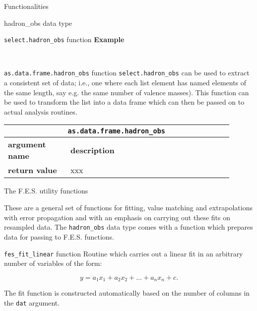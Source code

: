 \documentclass[10pt,a5paper]{article}
\begin{document}
\begin{section}{Functionalities}
\begin{subsection}{{\ttfamily hadron\_obs} data type}
\begin{subsubsection}{{\tt select.hadron\_obs} function}
\textbf{Example}

\

\end{subsubsection}

\begin{subsubsection}{ {\tt as.data.frame.hadron\_obs} function }
{\tt select.hadron\_obs} can be used to extract a consistent set of data; i.e., one where each list element has named elements of the same length, say e.g. the same number of valence masses).
This function can be used to transform the list into a data frame which can then be passed on to actual analysis routines.

{ \centering
\begin{tabular}{|p{0.25\linewidth}|p{0.65\linewidth}|}
\hline
\multicolumn{2}{|c|}{ {\tt as.data.frame.hadron\_obs} } \\
\hline \hline \textbf{argument name} & \textbf{description} \\ \hline
\hline 
\textbf{return value} & xxx \\
\hline
\end{tabular}
} %

\end{subsubsection}

\end{subsection} %

\begin{subsection}{The F.E.S. utility functions}

These are a general set of functions for fitting, value matching and extrapolations with error propagation and with an emphasis on carrying out these fits on resampled data.
The {\tt hadron\_obs} data type comes with a function which prepares data for passing to F.E.S. functions. 

\begin{subsubsection}{ {\tt fes\_fit\_linear} function }
Routine which carries out a linear fit in an arbitrary number of variables of the form:

\begin{equation}
y=a_1 x_1 + a_2 x_2 + \ldots + a_n x_n + c.
\end{equation}

The fit function is constructed automatically based on the number of columns in the {\tt dat} argument.


\end{subsubsection}
\end{subsection}
\end{section}
\end{document}
